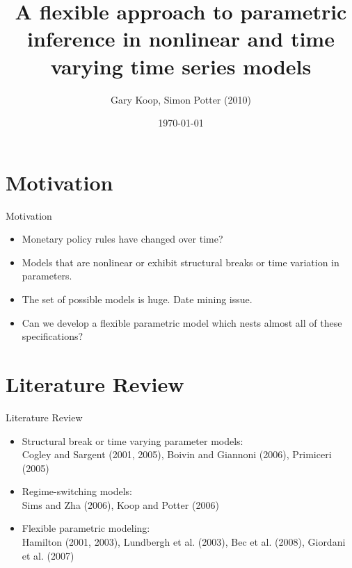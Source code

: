 \documentclass[dvipsnames,mathserif]{beamer}
\begin{document}
\rightskip\rightmargin
\title{A flexible approach to parametric inference in nonlinear and time varying time series models }
\author{Gary Koop, Simon Potter (2010)}


\footnotesize{\date{\today }


\begin{frame}
\maketitle
\end{frame}


%
\footnotesize \tableofcontents
%
\section{Motivation}
\begin{frame}{Motivation}
    \begin{itemize}
        \item Monetary policy rules have changed over time?
        \item Models that are nonlinear or exhibit structural breaks or time variation in parameters.
        \item The set of possible models is huge. Date mining issue.
        \item Can we develop a flexible parametric model which nests almost all of these specifications?
    \end{itemize}  
\end{frame}


\section{Literature Review}
\begin{frame}{Literature Review}
    \begin{itemize}
        \item Structural break or time varying parameter models:\\
        Cogley and Sargent (2001, 2005), Boivin and Giannoni (2006), Primiceri (2005)
        \item Regime-switching models:\\
        Sims and Zha (2006), Koop and Potter (2006)
        \item Flexible parametric modeling:\\
        Hamilton (2001, 2003), Lundbergh et al. (2003), Bec et al. (2008), Giordani et al. (2007)
    \end{itemize}
\end{frame}

}
\end{document}

